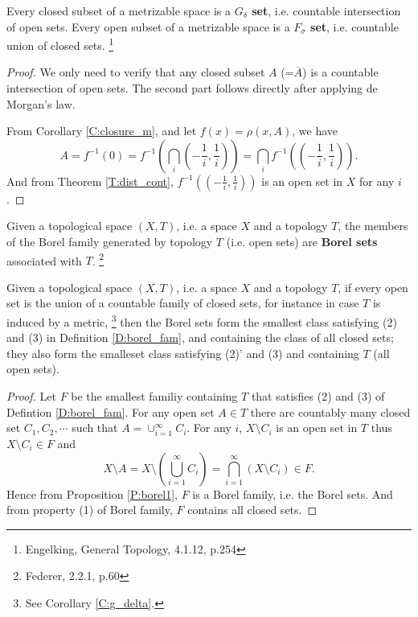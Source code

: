 \begin{corollary} \label{C:g_delta}
Every closed subset of a metrizable space is a \textbf{$G_{\delta}$ set}, 
i.e. countable intersection of open sets.
Every open subset of a metrizable space is a \textbf{$F_{\sigma}$ set}, 
i.e. countable union of closed sets.
\footnote{Engelking, General Topology, 4.1.12, p.254}
\end{corollary}
\begin{proof}
We only need to verify that any closed subset $A$ (=$\overline{A}$) is a countable
intersection of open sets. The second part follows directly after applying de 
Morgan's law. 

From Corollary \ref{C:closure_m}, and let $f(x)=\rho(x,A)$, we have 
\[
  A=f^{-1}(0)
   =f^{-1}\left( \bigcap_{i} \left( -\frac{1}{i}, \frac{1}{i} \right) \right)
   =\bigcap_{i} f^{-1}\left( \left( -\frac{1}{i}, \frac{1}{i} \right) \right).
\]
And from Theorem \ref{T:dist_cont}, 
$f^{-1}\left( \left( -\frac{1}{i}, \frac{1}{i} \right) \right)$ is an open set
in $X$ for any $i$.
\end{proof}





\begin{definition}
Given a topological space $(X,T)$, i.e. a space $X$ and a topology $T$, the
members of the Borel family generated by topology $T$ (i.e. open sets) are
\textbf{Borel sets}
associated with $T$.
\footnote{Federer, 2.2.1, p.60}
\end{definition}


\begin{proposition} \label{P:borel}
Given a topological space $(X,T)$, i.e. a space $X$ and a topology $T$, if every
open set is the union of a countable family of closed sets, for instance in case
$T$ is induced by a metric, 
\footnote{See Corollary \ref{C:g_delta}.}
then the Borel sets form the smallest class
satisfying (2) and (3) in Definition \ref{D:borel_fam}, and containing the class
of all closed sets; they also form the smalleset class satisfying (2)' and (3)
and containing $T$ (all open sets).
\end{proposition}
\begin{proof}
Let $F$ be the smallest familiy containing $T$ that satisfies (2) and (3) of
Defintion \ref{D:borel_fam}. For any open set $A\in T$ there are countably many
closed set $C_1,C_2,\cdots$ such that $A=\cup_{i=1}^{\infty} C_i$. For any $i$,
$X\setminus C_i$ is an open set in $T$ thus $X\setminus C_i\in F$ and
\[
  X\setminus A = X\setminus \left( \bigcup_{i=1}^{\infty} C_i \right)
               = \bigcap_{i=1}^{\infty} \left( X\setminus C_i \right) \in F.
\]
Hence from Proposition \ref{P:borel1}, $F$ is a Borel family, i.e. the Borel
sets. And from property (1) of Borel family, $F$ contains all closed sets.
\end{proof}


